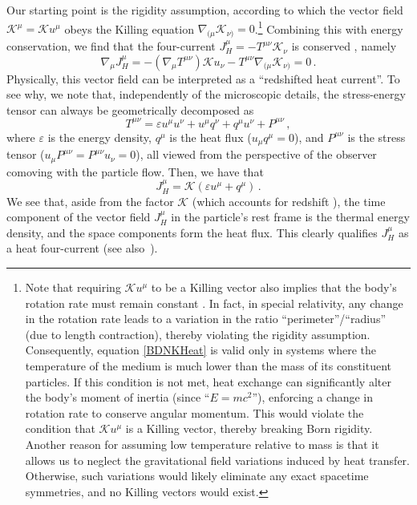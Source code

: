 \documentclass[a4paper, amsfonts, amssymb, amsmath, reprint, showkeys, nofootinbib, twoside, onecolumn,notitlepage]{revtex4-1}
\newcommand{\K}{{\mathcal{K}}}
\theoremstyle{definition}
\theoremstyle{theorem}
\begin{document}
Our starting point is the rigidity assumption, according to which the vector field $\K^\mu=\K u^\mu$ obeys the Killing equation $\nabla_{(\mu} \K_{\nu)}=0$.\footnote{
    Note that requiring $\K u^\mu$ to be a Killing vector also implies that the body's rotation rate must remain constant \cite{Herglotz1910,Noether1910}. In fact, in special relativity, any change in the rotation rate leads to a variation in the ratio ``perimeter''/``radius'' (due to length contraction), thereby violating the rigidity assumption. Consequently, equation \eqref{BDNKHeat} is valid only in systems where the temperature of the medium is much lower than the mass of its constituent particles. If this condition is not met, heat exchange can significantly alter the body's moment of inertia (since ``$E = mc^2$''), enforcing a change in rotation rate to conserve angular momentum. This would violate the condition that $\K u^\mu$ is a Killing vector, thereby breaking Born rigidity. Another reason for assuming low temperature relative to mass is that it allows us to neglect the gravitational field variations induced by heat transfer. Otherwise, such variations would likely eliminate any exact spacetime symmetries, and no Killing vectors would exist.}
Combining this with energy conservation, we find that the four-current $J_H^\mu=-T^{\mu \nu}\K_\nu$ is conserved \cite[\S 3.2]{Hawking1973}, namely
\begin{equation}\label{conserviamo}
\nabla_\mu J^\mu_H =-(\nabla_\mu T^{\mu\nu}) \K u_\nu- T^{\mu \nu}\nabla_{(\mu}\K_{\nu)}=0 \, .
\end{equation}
Physically, this vector field can be interpreted as a ``redshifted heat current''. To see why, we note that, independently of the microscopic details, the stress-energy tensor can always be geometrically decomposed as \cite{Eckart40,Israel_Stewart_1979,Hishcock1983,rezzolla_book}
\begin{equation}\label{decompo}
T^{\mu \nu}=\varepsilon u^\mu u^\nu +u^\mu q^\nu + q^\mu u^\nu  +P^{\mu \nu} \, ,
\end{equation}
where $\varepsilon$ is the energy density, $q^\mu$ is the heat flux ($u_\mu q^\mu=0$), and $P^{\mu \nu}$ is the stress tensor ($u_\mu P^{\mu \nu}=P^{\mu \nu}u_\nu=0$), all viewed from the perspective of the observer comoving with the particle flow. Then, we have that
\begin{equation}\label{JHHH}
J_H^\mu =\K (\varepsilon u^\mu + q^\mu) \, .
\end{equation}
We see that, aside from the factor $\K$ (which accounts for redshift \cite[\S 27]{landau5}), the time component of the vector field $J_H^\mu$ in the particle's rest frame is the thermal energy density, and the space components form the heat flux. This clearly qualifies $J_H^\mu$ as a heat four-current (see also~\cite{Van:2007pw,Van:2008cy}).
\end{document}
